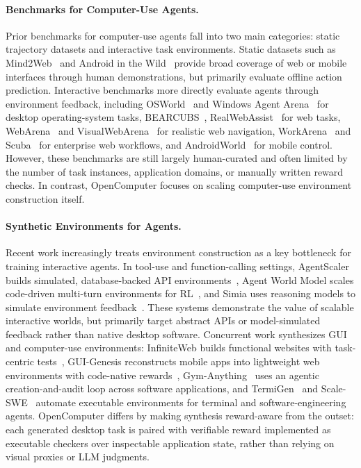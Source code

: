 \documentclass{llmxive}
\providecommand{\ours}{OpenComputer\xspace}
\begin{document}
\paragraph{Benchmarks for Computer-Use Agents.}
Prior benchmarks for computer-use agents fall into two main categories: static trajectory datasets and interactive task environments. Static datasets such as
Mind2Web~\citep{deng2023mind2web} and Android in the Wild~\citep{rawles2023androidinthewild} provide broad coverage of web or mobile interfaces through human demonstrations, but primarily evaluate offline action
prediction. Interactive benchmarks more directly evaluate agents through environment feedback, including OSWorld~\citep{xie2024osworld} and Windows Agent Arena~\citep{bonatti2024windows} for desktop operating-system tasks, BEARCUBS~\citep{song2025bearcubs}, RealWebAssist~\citep{ye2026realwebassist}
for web tasks, WebArena~\citep{zhou2023webarena} and VisualWebArena~\citep{koh2024visualwebarena} for realistic web navigation, WorkArena~\citep{drouin2024workarena} and Scuba~\citep{dai2025scuba} for enterprise web workflows, and AndroidWorld~\citep{rawles2024androidworld} for mobile control.
However, these benchmarks are still largely human-curated and often limited by the number of task instances, application domains, or manually written reward checks. In contrast, \ours focuses on scaling computer-use environment construction itself.


\paragraph{Synthetic Environments for Agents.}
Recent work increasingly treats environment construction as a key bottleneck for
training interactive agents. In tool-use and function-calling settings,
AgentScaler builds simulated, database-backed API environments~\citep{fang2025towards},
Agent World Model scales code-driven multi-turn environments for RL~\citep{wang2026agent},
and Simia uses reasoning models to simulate environment feedback~\citep{li2025simulating}.
These systems demonstrate the value of scalable interactive worlds, but primarily target
abstract APIs or model-simulated feedback rather than native desktop software. Concurrent work synthesizes GUI and computer-use environments: InfiniteWeb builds
functional websites with task-centric tests~\citep{zhang2026infiniteweb}, GUI-Genesis
reconstructs mobile apps into lightweight web environments with code-native rewards~\citep{cao2026gui},
Gym-Anything~\citep{aggarwal2026gym} uses an agentic creation-and-audit loop across software applications,
and TermiGen~\citep{zhu2026termigen} and Scale-SWE~\citep{zhao2026immersion} automate executable environments for terminal and software-engineering agents. OpenComputer differs by making synthesis reward-aware from the outset: each generated desktop task is paired with verifiable reward implemented as executable checkers over inspectable application state,
rather than relying on visual proxies or LLM judgments.
\end{document}
